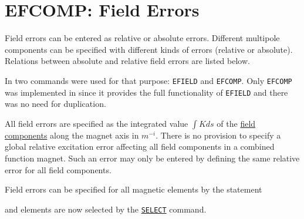 

%

\section{EFCOMP: Field Errors}
\label{sec:efcomp}
Field errors can be entered as relative or absolute errors. Different
multipole components can be specified with different kinds of errors
(relative or absolute). Relations between absolute and relative field
errors are listed below.  

In \madeight two commands were used for that purpose: {\tt EFIELD} 
and {\tt EFCOMP}.
Only {\tt EFCOMP} was implemented in \madx since it provides the full 
functionality
of {\tt EFIELD} and there was no need for duplication.  

All field errors are specified as the integrated value $\int K ds$ 
of the \hyperref[sec:sign_convention]{field components} along the magnet axis 
in $m^{-i}$. There is no provision
to specify a global relative excitation error affecting all field
components in a combined function magnet. Such an error may only be
entered by defining the same relative error for all field components.  

Field errors can be specified for all magnetic elements by the statement  


and elements are now selected by the
\hyperref[sec:select]{\tt SELECT} command. 

